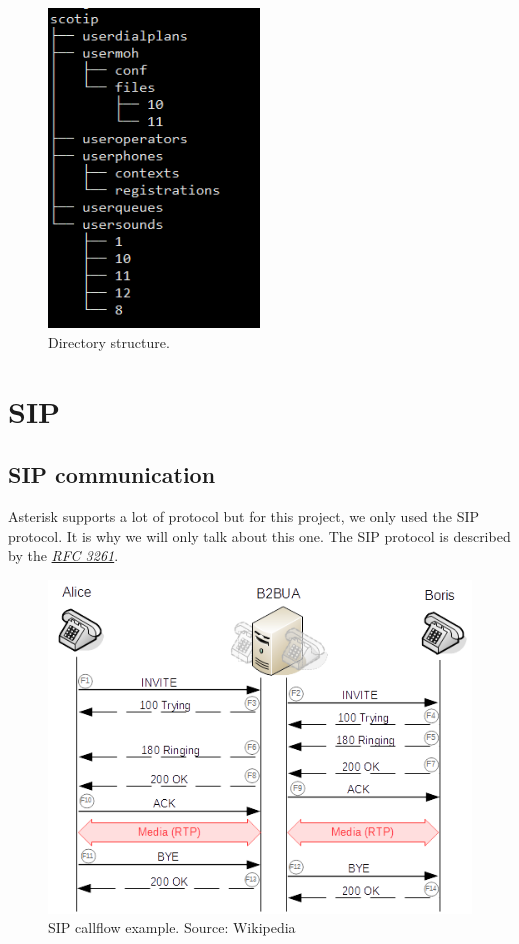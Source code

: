 \begin{figure}[!ht]
  \caption{Directory structure.}
  \centering
    \includegraphics[width=0.5\textwidth]{img/files_struct_conf.png}
\end{figure}


\section{SIP}

\subsection{SIP communication}
Asterisk supports a lot of protocol but for this project, we only used the SIP protocol. It is why we will only talk about this one.
The SIP protocol is described by the \href{http://www.rfc-base.org/rfc-3261.html}{\textit{RFC 3261}}.


\begin{figure}[!ht]
  \caption{SIP callflow example. Source: Wikipedia}
  \centering
    \includegraphics[width=1\textwidth]{img/callflow.png}
\end{figure}

